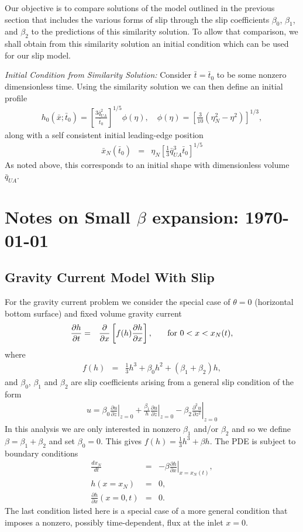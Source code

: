 \documentclass[11pt]{article}
\newcommand{\bea}{\begin{eqnarray}}
\newcommand{\eea}{\end{eqnarray}}
\begin{document}
Our objective is to compare solutions of the model outlined in the previous section that includes the various forms of slip 
through the slip coefficients $\beta_0$, $\beta_1$, and $\beta_2$ to the predictions of this similarity 
solution.   To allow that comparison, we shall obtain from this similarity solution an initial condition which can be used 
for our slip model.  

{\it Initial Condition from Similarity Solution:}  Consider $\bar{t} = \bar{t}_0$ to be some nonzero dimensionless time.  Using the
similarity solution we can then define an initial profile
\bea
h_0(\bar{x}; \bar{t}_0) =  \left[ \frac{ 3 \bar{q}_{UA}^{2} }{\bar{t}_0 } \right]^{1/5} \phi(\eta), \quad
\phi(\eta)  =  \left[ \frac{3}{10} \left( \eta_N^2 - \eta^2 \right) \right]^{1/3},
\eea
along with a self consistent initial leading-edge position
\bea
\bar{x}_N(\bar{t}_0) & = & \eta_N \left[ \frac{1}{3} \bar{q}_{UA}^{3} \bar{t}_0 \right]^{1/5}
\eea
As noted above, this corresponds to an initial shape with dimensionless volume $\bar{q}_{UA}$.



\section{Notes on Small $\beta$ expansion: \today}

{\color{red}{DMA: Still need to edit this part ... May 2020}}

\subsection{Gravity Current Model With Slip}

For the gravity current problem we consider the special case of $\theta =0$ (horizontal bottom surface) and fixed volume gravity current
\bea
\frac{\partial h}{\partial t} & = & \frac{\partial }{\partial x} \left[ f(h) \frac{\partial h}{\partial x} \right],\hspace{0.25in}\mbox{for $0 < x < x_N(t)$},
\eea
where
\bea
f(h) & = & \frac{1}{3} h^3 + \beta_0 h^2 + (\beta_1 + \beta_2) h,
\eea
and $\beta_0$, $\beta_1$ and $\beta_2$ are slip coefficients arising from a general slip condition of the form
\bea
u = \beta_0 \left. \frac{\partial u}{\partial z} \right|_{z=0}+ \frac{\beta_1}{h} \left. \frac{\partial u}{\partial z} \right|_{z=0}- \beta_2 \left. \frac{\partial^2 u}{\partial z^2}  \right|_{z=0}
\eea
In this analysis we are only interested in nonzero $\beta_1$ and/or $\beta_2$ and so we define $\beta = \beta_1 + \beta_2$ and set $\beta_0=0$.
This gives $f(h) = \frac{1}{3} h^3 + \beta h$.
The PDE is subject to boundary conditions
\bea
\frac{dx_N}{dt} & = & - \beta \left. \frac{\partial h}{\partial x} \right|_{x=x_N(t)},\\
h(x=x_N) & = & 0, \\
\frac{\partial h}{\partial x}(x=0,t) & = & 0.
\eea
The last condition listed here is a special case of a more general condition that imposes a nonzero, possibly time-dependent, flux at the inlet $x=0$.
\end{document}
